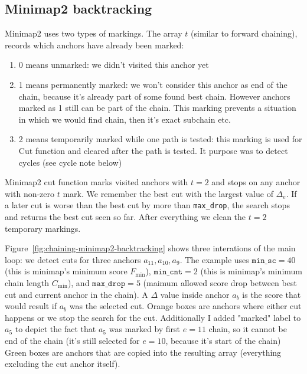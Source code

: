 \subsection{Minimap2 backtracking}

Minimap2 uses two types of markings. 
The array \(t\) (similar to forward chaining), records which anchors have already been marked:
\begin{enumerate}
  \item 0 means unmarked: we didn't visited this anchor yet
  \item 1 means permanently marked: we won't consider this anchor as end of the chain, because it's already part of some found best chain. However anchors marked as 1 still can be part of the chain. This marking prevents a situation in which we would find chain, then it's exact subchain etc.
  \item 2 means temporarily marked while one path is tested: this marking is used for $\text{Cut}$ function and cleared after the path is tested. It purpose was to detect cycles (see cycle note below)
\end{enumerate}


Minimap2 cut function marks visited anchors with $t=2$ and stops on any anchor with non-zero $t$ mark.
We remember the best cut with the largest value of \(\Delta_e\). If a later cut is worse than the
best cut by more than \texttt{max\_drop}, the search stops and returns the best
cut seen so far. After everything we clean the $t=2$ temporary markings.

Figure~\ref{fig:chaining-minimap2-backtracking} shows three interations of the main loop: we detect cuts for three anchors $a_{11}, a_{10}, a_9$. The example uses
\(\texttt{min\_sc}=40\) (this is minimap's minimum score $F_{\text{min}}$), \(\texttt{min\_cnt}=2\) (this is minimap's minimum chain length $C_{\text{min}}$), and
\(\texttt{max\_drop}=5\) (maimum allowed score drop between best cut and current anchor in the chain). A \(\Delta\) value inside anchor \(a_b\) is the
score that would result if \(a_b\) was the selected cut. 
Orange boxes are anchors where either cut happens or we stop the search for the cut. Additionally I added "marked" label to $a_5$ to depict the fact that $a_5$ was marked by first $e=11$ chain, so it cannot be end of the chain (it's still selected for $e=10$, because it's start of the chain)
Green boxes are anchors that are copied into the resulting array (everything excluding the cut anchor itself). 

